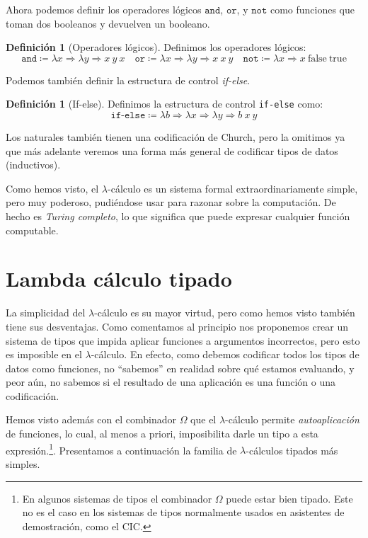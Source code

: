 \documentclass[
  a4paper, 
  10pt, 
  parskip=half, 
  toc=bibliography,
]{scrbook}
\theoremstyle{definition}
\theoremstyle{bolddef}
\newtheorem{definition}[theorem]{Definición}
\newcommand{\funfont}[1]{\texttt{#1}}
\renewcommand{\mapsto}{\Rightarrow}
\newcommand{\LeanTrue}{\text{true}}
\newcommand{\LeanFalse}{\text{false}}
\begin{document}
Ahora podemos definir los operadores lógicos \(\texttt{and}\), \(\texttt{or}\), y
\(\texttt{not}\) como funciones que toman dos booleanos y devuelven un booleano.

\begin{definition}[Operadores lógicos]
  Definimos los operadores lógicos:
  \[
    \funfont{and} \coloneqq \lambda x \mapsto \lambda y \mapsto x \ y \ x \quad
    \funfont{or} \coloneqq \lambda x \mapsto \lambda y \mapsto x \ x \ y \quad
    \funfont{not} \coloneqq \lambda x \mapsto x \ \LeanFalse \ \LeanTrue
  \]
\end{definition}

Podemos también definir la estructura de control \emph{if-else}.

\begin{definition}[If-else]
  Definimos la estructura de control \funfont{if-else} como:
  \[
  \funfont{if-else} \coloneqq \lambda b \mapsto \lambda x \mapsto \lambda y \mapsto b \ x \ y 
  \]
\end{definition}

Los naturales también tienen una codificación de Church, pero la omitimos ya que
más adelante veremos una forma más general de codificar tipos de datos (inductivos).

Como hemos visto, el \(\lambda\)-cálculo es un sistema formal extraordinariamente simple, pero muy poderoso,
pudiéndose usar para razonar sobre la computación. De hecho es \emph{Turing
completo}, lo que significa que puede expresar cualquier función computable.

\section{Lambda cálculo tipado}

La simplicidad del \(\lambda\)-cálculo es su mayor virtud, pero como hemos visto también tiene
sus desventajas. Como comentamos al principio nos proponemos crear un sistema de
tipos que impida aplicar funciones a argumentos incorrectos, pero esto es imposible en el 
\(\lambda\)-cálculo. En efecto, como debemos codificar todos los tipos de datos como
funciones, no \enquote{sabemos} en realidad sobre qué estamos evaluando, y peor 
aún, no sabemos si el resultado de una aplicación es una función o una codificación.

Hemos visto además con el combinador \(\Omega\) que el \(\lambda\)-cálculo permite
\emph{autoaplicación} de funciones, lo cual, al menos a priori, imposibilita
darle un tipo a esta expresión.\footnote{
  En algunos sistemas de tipos el combinador \(\Omega\) puede estar bien tipado. Este no es
  el caso en los sistemas de tipos normalmente usados en asistentes de demostración, como el CIC.}.
Presentamos a continuación la familia de \(\lambda\)-cálculos tipados más simples.
\end{document}
